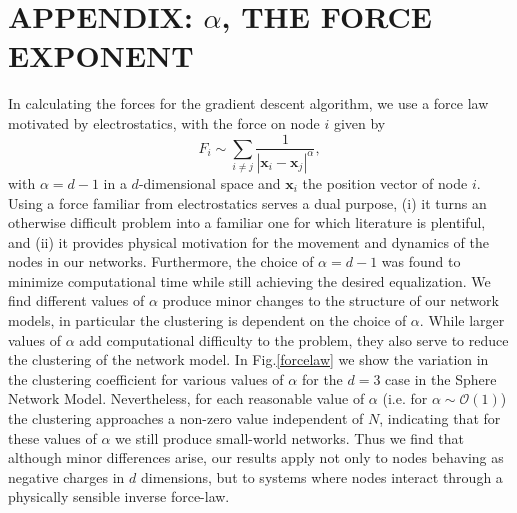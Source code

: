 \documentclass[aps,pre,manuscript,superscriptaddress,amsmath,amssymb,nofootinbib]{revtex4-1}
\begin{document}
\section{APPENDIX: $\alpha$, THE FORCE EXPONENT}
\label{sub:forcelaw}
In calculating the forces for the gradient descent algorithm, we use a force law motivated by electrostatics, with the force on node $i$ given by 
\begin{equation}
F_i \sim \sum_{i \neq j} \frac{1}{|\textbf{x}_i - \textbf{x}_j|^{\alpha}}, 
\end{equation}
with $\alpha = d-1$ in a $d$-dimensional space and $\textbf{x}_i$ the position vector of node $i$.
Using a force familiar from electrostatics serves a dual purpose, (i) it turns an otherwise difficult problem into a familiar one for which literature is plentiful, and (ii) it provides physical motivation for the movement and dynamics of the nodes in our networks.
Furthermore, the choice of $\alpha = d-1$ was found to minimize computational time while still achieving the desired equalization.
We find different values of $\alpha$ produce minor changes to the structure of our network models, in particular the clustering is dependent on the choice of $\alpha$.
While larger values of $\alpha$ add computational difficulty to the problem, they also serve to reduce the clustering of the network model.
In Fig.\ref{forcelaw} we show the variation in the clustering coefficient for various values of $\alpha$ for the $d = 3$ case in the Sphere Network Model.
Nevertheless, for each reasonable value of $\alpha$ (i.e. for $\alpha \sim \mathcal O (1)$) the clustering approaches a non-zero value independent of $N$, indicating that for these values of $\alpha$ we still produce small-world networks.
Thus we find that although minor differences arise, our results apply not only to nodes behaving as negative charges in $d$ dimensions, but to systems where nodes interact through a physically sensible inverse force-law.
\end{document}

